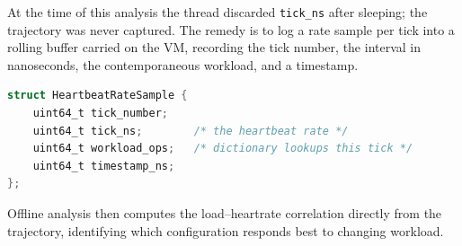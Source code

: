At the time of this analysis the thread discarded \lstinline{tick_ns} after
sleeping; the trajectory was never captured. The remedy is to log a rate sample
per tick into a rolling buffer carried on the VM, recording the tick number,
the interval in nanoseconds, the contemporaneous workload, and a timestamp.

\begin{lstlisting}[language=C]
struct HeartbeatRateSample {
    uint64_t tick_number;
    uint64_t tick_ns;        /* the heartbeat rate */
    uint64_t workload_ops;   /* dictionary lookups this tick */
    uint64_t timestamp_ns;
};
\end{lstlisting}

Offline analysis then computes the load--heartrate correlation directly from
the trajectory, identifying which configuration responds best to changing
workload.

